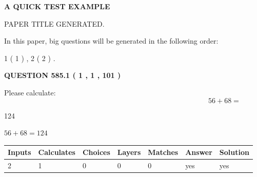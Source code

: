 \documentclass[12pt]{article}
\begin{document}
   
 \vspace{0.2in}
{\LARGE {\textbf{ A QUICK TEST EXAMPLE}}}
   
   
 PAPER TITLE GENERATED.
   
   
   
\vspace{0.2in}
   
In this paper, big questions will be generated in the following order: 
   
   
   1 ( 1 )
 ,
   2 ( 2 )
 .
  
\vspace{0.2in}
  
{\textbf{\Large{QUESTION
585.1 
 ( 1 , 1 , 101 )
}}}
  
  
 
Please calculate:
\begin{equation}
56 +  %
68 = \nonumber
\end{equation}
 
 
 
\noindent{}
 
 

124
 
 
\noindent{}
 
 

 
 
 
\noindent{}
 
 

$ %
56 +  %
68=   %
124$
 
 
\noindent{}
 
 

 
   
   
   
   
\noindent\begin{tabular}{|l|l|l|l|l|l|l|}
 \hline
Inputs & Calculates & Choices & Layers & Matches & Answer & Solution \\ \hline
 2  & 
 1  & 
 0
  & 
 0  & 
 0  & 
  yes & 
  yes 
  \\ \hline
 \end{tabular}
   
   
   
   
\noindent{}
   
\end{document}

